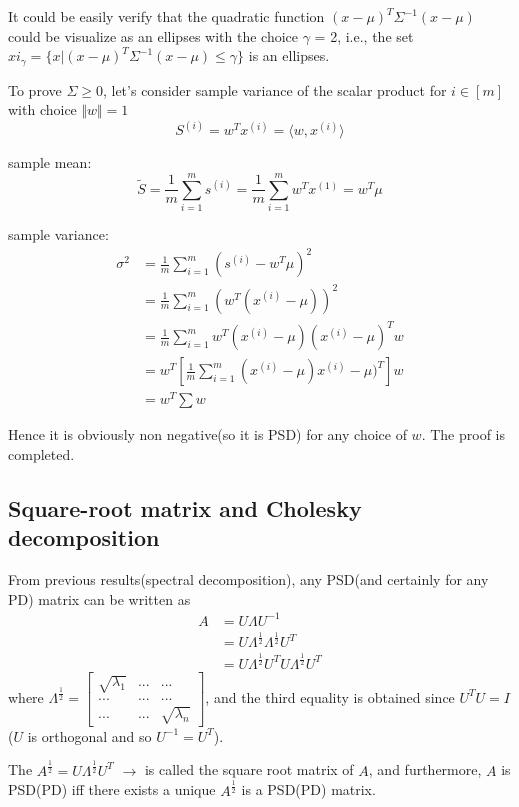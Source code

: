 It could be easily verify that the quadratic function $(x - \mu)^T \Sigma^{-1}(x - \mu)$ could be visualize as an ellipses with the choice $\gamma$ = 2, i.e., the set $xi_{\gamma} = \{x | (x - \mu)^T \Sigma^{-1}(x - \mu)\leq \gamma \}$ is an ellipses.


To prove $\Sigma\geq 0$, let's consider sample variance of the scalar product for $i\in [m]$ with choice $\Vert w\Vert=1$
$$S^{(i)} =w^Tx^{(i)} =\langle w, x^{(i)}\rangle$$

sample mean:
$$\tilde{S} = \frac{1}{m}\sum^m_{i=1}s^{(i)} = \frac{1}{m}\sum^m_{i=1}w^Tx^{(1)} = w^T\mu$$

sample variance: 
\begin{align*}
\sigma^2 &= \frac{1}{m}\sum^m_{i=1}(s^{(i)} - w^T\mu)^2 \\
&= \frac{1}{m}\sum^m_{i=1}(w^T(x^{(i)} -\mu))^2\\
&=\frac{1}{m}\sum^m_{i=1}w^T(x^{(i)}-\mu)(x^{(i)}-\mu)^Tw\\
&= w^T[\frac{1}{m}\sum^m_{i=1}(x^{(i)}-\mu)x^{(i)}-\mu)^T]w\\
&= w^T\sum w
\end{align*}

Hence it is obviously non negative(so it is PSD) for any choice of $w$. The proof is completed.


\subsection{Square-root matrix and Cholesky decomposition}

From previous results(spectral decomposition), any PSD(and certainly for any PD) matrix can be written as
\begin{align*}
A &= U\Lambda U^{-1} \\
&=U\Lambda^{\frac{1}{2}}\Lambda^{\frac{1}{2}}U^{T}\\
&= U\Lambda^{\frac{1}{2}}U^TU\Lambda^{\frac{1}{2}}U^T
\end{align*}
where $\Lambda^{\frac{1}{2}}=
\begin{bmatrix}%
	\sqrt{\lambda_1}&...&...\\
	...&...&...\\
	...&...&\sqrt{\lambda_n}
\end{bmatrix}$,
and the third equality is obtained since $U^TU=I$ ($U$ is orthogonal and so $U^{-1}=U^T$).


The $A^{\frac{1}{2}} = U\Lambda^{\frac{1}{2}}U^T$ $\rightarrow$ is called the square root matrix of $A$, and furthermore, $A$ is PSD(PD) iff there exists a unique $A^{\frac{1}{2}}$ is a PSD(PD) matrix.

